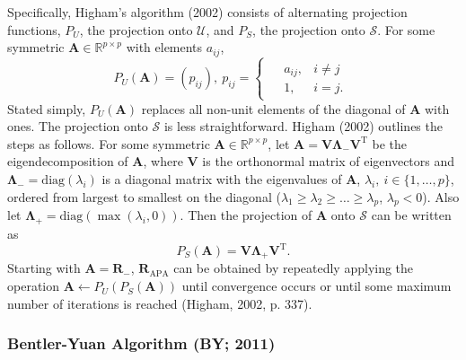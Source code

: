 \documentclass[
  english,
  man]{apa6}
\begin{document}
Specifically, Higham's algorithm (2002) consists of alternating projection functions, \(P_U\), the projection onto \(\mathcal{U}\), and \(P_S\), the projection onto \(\mathcal{S}\). For some symmetric \(\mathbf{A} \in \mathbb{R}^{p \times p}\) with elements \(a_{ij}\),
\begin{equation}
P_U(\mathbf{A}) = (p_{ij}), \: p_{ij} = 
\begin{cases}
\begin{aligned}
&a_{ij}, &i \neq j \\
&1, &i = j.
\end{aligned}
\end{cases}
\label{eq:proj-U}
\end{equation}
Stated simply, \(P_U(\mathbf{A})\) replaces all non-unit elements of the diagonal of \(\mathbf{A}\) with ones. The projection onto \(\mathcal{S}\) is less straightforward. Higham (2002) outlines the steps as follows. For some symmetric \(\mathbf{A} \in \mathbb{R}^{p \times p}\), let \(\mathbf{A} = \mathbf{V} \mathbf{\Lambda}_- \mathbf{V}^{\textrm{T}}\) be the eigendecomposition of \(\mathbf{A}\), where \(\mathbf{V}\) is the orthonormal matrix of eigenvectors and \(\mathbf{\Lambda_-} = \textrm{diag}(\lambda_i)\) is a diagonal matrix with the eigenvalues of \(\mathbf{A}\), \(\lambda_i, \: i \in \{1, \dots, p \}\), ordered from largest to smallest on the diagonal (\(\lambda_1 \geq \lambda_2 \geq \dots \geq \lambda_p\), \(\lambda_p < 0\)). Also let \(\mathbf{\Lambda}_+ = \textrm{diag}(\max(\lambda_i, 0))\). Then the projection of \(\mathbf{A}\) onto \(\mathcal{S}\) can be written as
\begin{equation}
P_S(\mathbf{A}) = \mathbf{V} \mathbf{\Lambda_+} \mathbf{V}^{\textrm{T}}.
\label{eq:proj-S}
\end{equation}
Starting with \(\mathbf{A} = \mathbf{R}_{-}\), \(\mathbf{R}_{\textrm{APA}}\) can be obtained by repeatedly applying the operation \(\mathbf{A} \leftarrow P_U(P_S(\mathbf{A}))\) until convergence occurs or until some maximum number of iterations is reached (Higham, 2002, p. 337).

\hypertarget{bentler-yuan-algorithm-by-2011}{%
\subsubsection{Bentler-Yuan Algorithm (BY; 2011)}\label{bentler-yuan-algorithm-by-2011}}
\end{document}
